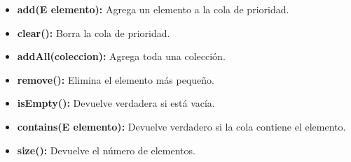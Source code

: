 \begin{itemize}
	\item \textbf{add(E elemento):} Agrega un elemento a la cola
de prioridad.
	\item \textbf{clear():} Borra la cola de prioridad.
	\item \textbf{addAll(coleccion):} Agrega toda una colección.
	\item \textbf{remove():} Elimina el elemento más pequeño.
	\item \textbf{isEmpty():} Devuelve verdadera si está vacía.
	\item \textbf{contains(E elemento):} Devuelve verdadero si la cola contiene el elemento.
	\item \textbf{size():} Devuelve el número de elementos.
\end{itemize}